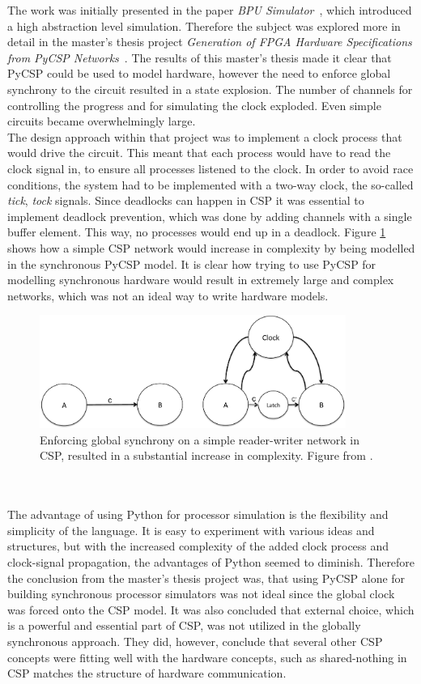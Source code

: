 The work was initially presented in the paper \textit{BPU Simulator}~\cite{Rehr2013}, which introduced a high abstraction level simulation. Therefore the subject was explored more in detail in the master's thesis project \textit{Generation of FPGA Hardware
Specifications from PyCSP Networks}~\cite{Skaarup14}. The results of this master's thesis made it clear that PyCSP could be used to model hardware, however the need to enforce global synchrony to the circuit resulted in a state explosion. The number of channels for controlling the progress and for simulating the clock exploded. Even simple circuits became overwhelmingly large.\\

The design approach within that project was to implement a clock process that would drive the circuit. This meant that each process would have to read the clock signal in, to ensure all processes listened to the clock. In order to avoid race conditions, the system had to be implemented with a two-way clock, the so-called \textit{tick}, \textit{tock} signals. Since deadlocks can happen in CSP it was essential to implement deadlock prevention, which was done by adding channels with a single buffer element. This way, no processes would end up in a deadlock. Figure \ref{fig:sme:clock_latch} shows how a simple CSP network would increase in complexity by being modelled in the synchronous PyCSP model. It is clear how trying to use PyCSP for modelling synchronous hardware would result in extremely large and complex networks, which was not an ideal way to write hardware models.
\begin{figure}[h!]
\centering
\includegraphics[width=10.0cm]{figures/clocked.pdf}
\caption{Enforcing global synchrony on a simple reader-writer network in CSP, resulted in a substantial increase in complexity. Figure from \cite{Vinter2014}.}
\label{fig:sme:clock_latch}
\end{figure}
\\\\
The advantage of using Python for processor simulation is the flexibility and simplicity of the language. It is easy to experiment with various ideas and structures, but with the increased complexity of the added clock process and clock-signal propagation, the advantages of Python seemed to diminish. Therefore the conclusion from the master's thesis project was, that using PyCSP alone for building synchronous processor simulators was not ideal since the global clock was forced onto the CSP model. It was also concluded that external choice, which is a powerful and essential part of CSP, was not utilized in the globally synchronous approach. They did, however, conclude that several other CSP concepts were fitting well with the hardware concepts, such as shared-nothing in CSP matches the structure of hardware communication.

